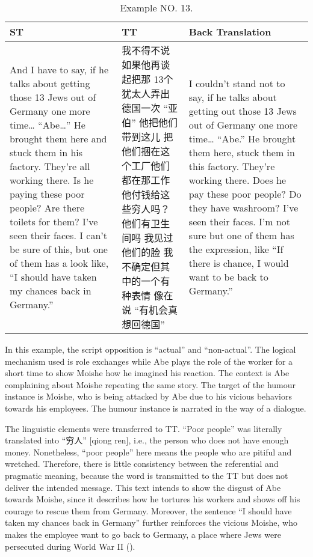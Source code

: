 \documentclass[english]{textolivre}
\begin{document}
\begin{table}[htpb]
\caption{Example NO. 13.}
\label{tbl13}
\begin{tabularx}{\linewidth}{XXX}
\toprule 
ST  & TT & Back Translation \\ 
\midrule
And I have to say, if he talks about getting those 13 Jews out 
of Germany one more time… 
“Abe…” 
He brought them here and stuck them in his factory. 
They're all working there. 
Is he paying these poor people? Are there toilets for them? I've seen their faces. 
I can't be sure of this, but one of them has a look like, “I should have taken my chances back in 
Germany.”  & 我不得不说 如果他再谈起把那 13个犹太人弄出德国一次 
“亚伯” 
他把他们带到这儿 把他们捆在这个工厂他们都在那工作他付钱给这些穷人吗？ 
他们有卫生间吗 我见过他们的脸 
我不确定但其中的一个有种表情 像在说 
“有机会真想回德国” & I couldn't stand not to say, if he talks about getting out those 13 Jews out of Germany one more time…
“Abe.”
He brought them here, stuck them in this factory. They're working there. Does he pay these poor people? Do they have washroom? I've seen their faces.
I'm not sure but one of them has the expression, like “If there is chance, I would want to be back to Germany.” \\ 
\bottomrule
\end{tabularx}
\end{table}

In this example, the script opposition is “actual” and “non-actual”. The logical mechanism used is role exchanges while Abe plays the role of the worker for a short time to show Moishe how he imagined his reaction. The context is Abe complaining about Moishe repeating the same story. The target of the humour instance is Moishe, who is being attacked by Abe due to his vicious behaviors towards his employees. The humour instance is narrated in the way of a dialogue. 

The linguistic elements were transferred to TT. “Poor people” was literally translated into “穷人” [qiong ren], i.e., the person who does not have enough money. Nonetheless, “poor people” here means the people who are pitiful and wretched. Therefore, there is little consistency between the referential and pragmatic meaning, because the word is transmitted to the TT but does not deliver the intended message. This text intends to show the disgust of Abe towards Moishe, since it describes how he tortures his workers and shows off his courage to rescue them from Germany. Moreover, the sentence “I should have taken my chances back in Germany” further reinforces the vicious Moishe, who makes the employee want to go back to Germany, a place where Jews were persecuted during World War II ().  
\end{document}
